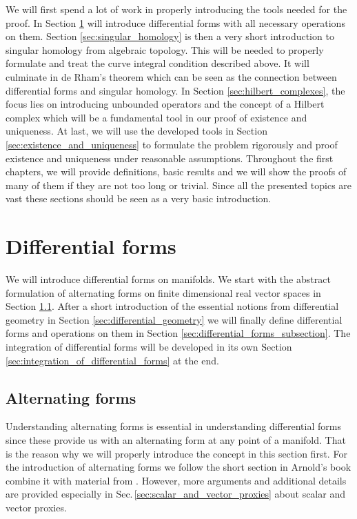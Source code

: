 \documentclass[../master_thesis.tex]{subfiles}
\begin{document}
We will first spend a lot of work in properly introducing the tools needed for the proof.
In Section \ref{sec:differential_forms} will introduce differential forms with 
all necessary operations on them. Section \ref{sec:singular_homology} is then a very short
introduction to  
singular homology from algebraic topology. This will be needed to properly formulate and treat the
curve integral condition described above. It will culminate in de Rham's theorem 
which can be seen as the connection between differential forms and singular homology.
In Section \ref{sec:hilbert_complexes}, the focus lies on introducing 
unbounded operators and the concept of a Hilbert complex which will be a
fundamental tool in our proof of existence and uniqueness. At last, we will 
use the developed tools in Section \ref{sec:existence_and_uniqueness} 
to formulate the problem rigorously and proof existence and uniqueness under 
reasonable assumptions. Throughout the first chapters, we will provide 
definitions, basic results and we will show the proofs of many of them if they are not too 
long or trivial. Since all the presented topics are vast these sections should be 
seen as a very basic introduction.

\section{Differential forms}\label{sec:differential_forms}

We will introduce differential forms on manifolds. We start with the abstract 
formulation of alternating forms on finite dimensional real vector spaces 
in Section \ref{sec:alternating_maps}. After a short introduction of 
the essential notions from differential geometry in Section \ref{sec:differential_geometry}
we will finally define differential forms and operations on them 
in Section \ref{sec:differential_forms_subsection}. The integration 
of differential forms will be developed in its own Section \ref{sec:integration_of_differential_forms} 
at the end.

\subsection{Alternating forms} \label{sec:alternating_maps}

Understanding alternating forms is essential in understanding differential forms 
since these provide us with an alternating form at any point of a manifold. 
That is the reason why we will properly introduce the concept in this 
section first.
For the introduction of alternating forms we follow
the short section in Arnold's book
\cite[Sec. 6.1.]{arnold} combine it 
with material from \cite[Sec.\,V.1]{topology_and_geometry}.
However, more arguments and additional details are provided especially  
in Sec.\,\ref{sec:scalar_and_vector_proxies} about scalar and vector proxies.
\end{document}
